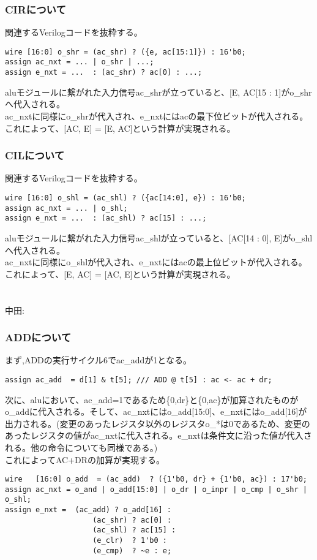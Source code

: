 \documentclass{jsarticle}
\begin{document}
\subsubsection*{CIRについて}
関連するVerilogコードを抜粋する。
\begin{lstlisting}
wire [16:0] o_shr = (ac_shr) ? ({e, ac[15:1]}) : 16'b0;
assign ac_nxt = ... | o_shr | ...;
assign e_nxt = ...  : (ac_shr) ? ac[0] : ...;
\end{lstlisting}
aluモジュールに繋がれた入力信号ac\_shrが立っていると、[E, AC[15 : 1]がo\_shrへ代入される。\\
ac\_nxtに同様にo\_shrが代入され、e\_nxtにはacの最下位ビットが代入される。\\
これによって、[AC, E] = [E, AC]という計算が実現される。

\subsubsection*{CILについて}
関連するVerilogコードを抜粋する。
\begin{lstlisting}
wire [16:0] o_shl = (ac_shl) ? ({ac[14:0], e}) : 16'b0;
assign ac_nxt = ... | o_shl;
assign e_nxt = ...  : (ac_shl) ? ac[15] : ...;
\end{lstlisting}
aluモジュールに繋がれた入力信号ac\_shlが立っていると、[AC[14 : 0], E]がo\_shlへ代入される。\\
ac\_nxtに同様にo\_shlが代入され、e\_nxtにはacの最上位ビットが代入される。\\
これによって、[E, AC] = [AC, E]という計算が実現される。 \\
\\
\\
中田:
\subsubsection*{ADDについて}
まず,ADDの実行サイクル6でac\_addが1となる。 \\
\begin{lstlisting}[caption=cpu\_ex3.v 166行目]
assign ac_add  = d[1] & t[5]; /// ADD @ t[5] : ac <- ac + dr;
\end{lstlisting}
次に、aluにおいて、ac\_add=1であるため\{0,dr\}と\{0,ac\}が加算されたものがo\_addに代入される。そして、ac\_nxtにはo\_add[15:0]、e\_nxtにはo\_add[16]が出力される。(変更のあったレジスタ以外のレジスタo\_*は0であるため、変更のあったレジスタの値がac\_nxtに代入される。e\_nxtは条件文に沿った値が代入される。他の命令についても同様である。) \\
これによってAC+DRの加算が実現する。
\begin{lstlisting}[caption=cpu\_module.v ALU modelより]
wire   [16:0] o_add  = (ac_add)  ? ({1'b0, dr} + {1'b0, ac}) : 17'b0;
assign ac_nxt = o_and | o_add[15:0] | o_dr | o_inpr | o_cmp | o_shr | o_shl;
assign e_nxt =  (ac_add) ? o_add[16] :
                    (ac_shr) ? ac[0] :
                    (ac_shl) ? ac[15] :
                    (e_clr)  ? 1'b0 :
                    (e_cmp)  ? ~e : e;
\end{lstlisting}
\end{document}
